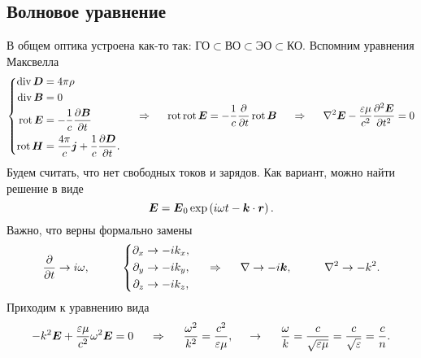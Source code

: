 \subsection{Волновое уравнение}

В общем оптика устроена как-то так: $\text{ГО} \subset \text{ВО} \subset \text{ЭО} \subset \text{КО}$.
Вспомним уравнения Максвелла
\begin{equation*}
    \left\{\begin{aligned}
            \mathop{\mathrm{div}}\nolimits \mbox{\boldmath $D$} &= 4 \pi \rho \\
            \mathop{\mathrm{div}}\nolimits \mbox{\boldmath $B$} &= 0 \\
            \mathop{\mathrm{rot}}\nolimits \mbox{\boldmath $E$} &= - \frac{1}{c}\frac{\partial \mbox{\boldmath $B$}}{\partial t} \\
            \mathop{\mathrm{rot}}\nolimits \mbox{\boldmath $H$} &= \frac{4\pi}{c} \mbox{\boldmath $j$} + \frac{1}{c} \frac{\partial \mbox{\boldmath $D$}}{\partial t}.
    \end{aligned}\right.
    \hspace{0.5cm} \Rightarrow \hspace{0.5cm}
    \mathop{\mathrm{rot}}\nolimits \mathop{\mathrm{rot}}\nolimits \mbox{\boldmath $E$} = - \frac{1}{c} \frac{\partial }{\partial t} \mathop{\mathrm{rot}}\nolimits \mbox{\boldmath $B$}
    \hspace{0.5cm} \Rightarrow \hspace{0.5cm}
    \nabla^2 \mbox{\boldmath $E$} - \frac{\varepsilon \mu}{c^2} \frac{\partial^2 \mbox{\boldmath $E$}}{\partial t^2} = 0
\end{equation*}
Будем считать, что нет свободных токов и зарядов. Как вариант, можно найти решение в виде
\begin{equation*}
    \mbox{\boldmath $E$} = \mbox{\boldmath $E$}_0 \exp\left(
        i \omega t - \mbox{\boldmath $k$} \cdot \mbox{\boldmath $r$}
    \right).
\end{equation*}
Важно, что верны формально замены
\begin{equation*}
    \frac{\partial }{\partial t} \to i \omega,
    \hspace{1 cm}
    \left\{\begin{aligned}
         \partial_{x} &\to - i k_x, \\
         \partial_{y} &\to - i k_y, \\
         \partial_{z} &\to - i k_z,  \\   
    \end{aligned}\right.
    \hspace{0.5cm} \Rightarrow \hspace{0.5cm}
    \nabla \to - i \mbox{\boldmath $k$},
    \hspace{1 cm}
    \nabla^2 \to - k^2.
\end{equation*}
Приходим к уравнению вида
\begin{equation*}
    - k^2 \mbox{\boldmath $E$} + \frac{\varepsilon \mu}{c^2} \omega^2 \mbox{\boldmath $E$} = 0
    \hspace{0.5cm} \Rightarrow \hspace{0.5cm}
    \frac{\omega^2}{k^2} = \frac{c^2}{\varepsilon \mu},
    \hspace{0.5cm} \to \hspace{0.5cm}
    \frac{\omega}{k} = \frac{c}{\sqrt{\varepsilon \mu}} = \frac{c}{\sqrt{\varepsilon}} = \frac{c}{n}.
\end{equation*}
